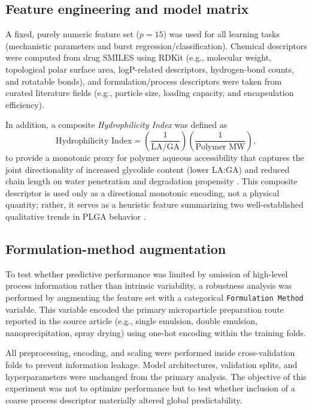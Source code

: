 \documentclass[preprint,12pt,authoryear]{elsarticle}
\begin{document}
\subsection{Feature engineering and model matrix}
A fixed, purely numeric feature set ($p=15$) was used for all learning tasks (mechanistic parameters and burst regression/classification). Chemical descriptors were computed from drug SMILES using RDKit \citep{RDKitZenodo} (e.g., molecular weight, topological polar surface area, logP-related descriptors, hydrogen-bond counts, and rotatable bonds), and formulation/process descriptors were taken from curated literature fields (e.g., particle size, loading capacity, and encapsulation efficiency).

In addition, a composite \textit{Hydrophilicity Index} was defined as
\begin{equation}
\text{Hydrophilicity Index} = \left(\frac{1}{\text{LA/GA}}\right)\left(\frac{1}{\text{Polymer MW}}\right),
\end{equation}
to provide a monotonic proxy for polymer aqueous accessibility that captures the joint directionality of increased glycolide content (lower LA:GA) and reduced chain length on water penetration and degradation propensity \citep{MakadiaSiegel2011,Fredenberg2011}. This composite descriptor is used only as a directional monotonic encoding, not a physical quantity; rather, it serves as a heuristic feature summarizing two well-established qualitative trends in PLGA behavior \citep{MakadiaSiegel2011,Fredenberg2011}.

\subsection{Formulation-method augmentation}
To test whether predictive performance was limited by omission of high-level process information rather than intrinsic variability, a robustness analysis was performed by augmenting the feature set with a categorical \texttt{Formulation Method} variable. This variable encoded the primary microparticle preparation route reported in the source article (e.g., single emulsion, double emulsion, nanoprecipitation, spray drying) using one-hot encoding within the training folds.

All preprocessing, encoding, and scaling were performed inside cross-validation folds to prevent information leakage. Model architectures, validation splits, and hyperparameters were unchanged from the primary analysis. The objective of this experiment was not to optimize performance but to test whether inclusion of a coarse process descriptor materially altered global predictability.
\end{document}
